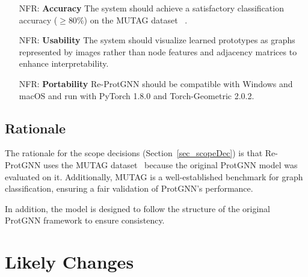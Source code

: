 \documentclass[12pt]{article}
\newcounter{nfrnum} %
\begin{document}
\noindent \begin{itemize}

\item[NFR\refstepcounter{nfrnum}\thenfrnum \label{NFR_Accuracy}:]
  \textbf{Accuracy} The system should achieve a satisfactory classification accuracy ($\geq80\%$) on the MUTAG dataset ~\citep{debnath1991structure}.

\item[NFR\refstepcounter{nfrnum}\thenfrnum \label{NFR_Usability}:] \textbf{Usability}
  The system should visualize learned prototypes as graphs represented by images rather than node features and adjacency matrices to enhance interpretability.


\item[NFR\refstepcounter{nfrnum}\thenfrnum \label{NFR_Portability}:]
  \textbf{Portability} Re-ProtGNN should be compatible with Windows and macOS and run with PyTorch 1.8.0 and Torch-Geometric 2.0.2.
  

\end{itemize}


\subsection{Rationale}

The rationale for the scope decisions (Section~\ref{sec_scopeDec}) is that Re-ProtGNN uses the MUTAG dataset~\citep{debnath1991structure} because the original ProtGNN model was evaluated on it. Additionally, MUTAG is a well-established benchmark for graph classification, ensuring a fair validation of ProtGNN's performance.

In addition, the model is designed to follow the structure of the original ProtGNN framework to ensure consistency.


\section{Likely Changes}    
\end{document}
